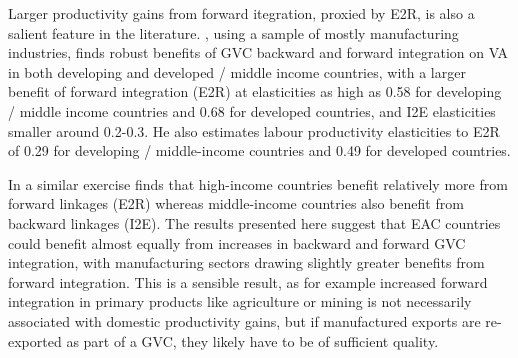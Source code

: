 \documentclass[a4paper]{article}
\begin{document}
Larger productivity gains from forward itegration, proxied by E2R, is also a salient feature in the literature. \citet{Kummritz20161}, using a sample of mostly manufacturing industries, finds robust benefits of GVC backward and forward integration on VA in both developing and developed / middle income countries, with a larger benefit of forward integration (E2R) at elasticities as high as 0.58 for developing / middle income countries and 0.68 for developed countries, and I2E elasticities smaller around 0.2-0.3. He also estimates labour productivity elasticities to E2R of 0.29 for developing / middle-income countries and 0.49 for developed countries. \newline 

In a similar exercise \citet{kummritz2015global} finds that high-income countries benefit relatively more from forward linkages (E2R) whereas middle-income countries also benefit from backward linkages (I2E). The results presented here suggest that EAC countries could benefit almost equally from increases in backward and forward GVC integration, with manufacturing sectors drawing slightly greater benefits from forward integration. 
This is a sensible result, as for example increased forward integration in primary products like agriculture or mining is not necessarily associated with domestic productivity gains, but if manufactured exports are re-exported as part of a GVC, they likely have to be of sufficient quality.  \newline 
\end{document}
